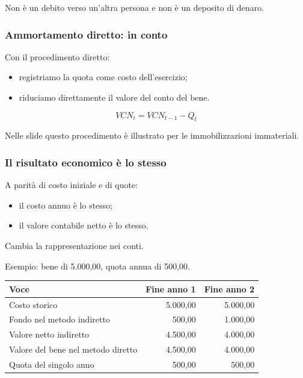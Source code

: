 \noindent Non è un debito
verso un'altra persona
e non è un deposito di denaro.


\subsubsection*{Ammortamento diretto:
in conto}

\noindent Con il procedimento diretto:

\begin{itemize}
    \item registriamo la quota
    come costo dell'esercizio;

    \item riduciamo direttamente
    il valore del conto del bene.
\end{itemize}

\[
\boxed{
VCN_t=VCN_{t-1}-Q_t
}
\]

\noindent Nelle slide questo procedimento
è illustrato per le immobilizzazioni immateriali.


\subsubsection*{Il risultato economico è lo stesso}

\noindent A parità di costo iniziale
e di quote:

\begin{itemize}
    \item il costo annuo è lo stesso;
    \item il valore contabile netto è lo stesso.
\end{itemize}

\noindent Cambia la rappresentazione nei conti.

\medskip

\noindent Esempio:
bene di 5.000,00,
quota annua di 500,00.

\begin{center}
    \small
    \begin{tabular}{|l|r|r|}
        \hline
        \textbf{Voce}
        & \textbf{Fine anno 1}
        & \textbf{Fine anno 2} \\
        \hline
        Costo storico
        & 5.000,00 & 5.000,00 \\
        \hline
        Fondo nel metodo indiretto
        & 500,00 & 1.000,00 \\
        \hline
        Valore netto indiretto
        & 4.500,00 & 4.000,00 \\
        \hline
        Valore del bene nel metodo diretto
        & 4.500,00 & 4.000,00 \\
        \hline
        Quota del singolo anno
        & 500,00 & 500,00 \\
        \hline
    \end{tabular}
\end{center}

